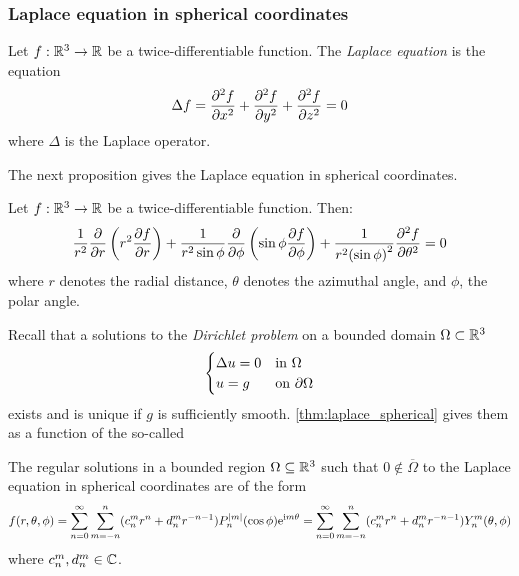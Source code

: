 \documentclass[../main.tex]{subfiles}
\begin{document}
\subsubsection{Laplace equation in spherical coordinates}\label{sec:laplace_spherical}
\begin{definition}
  Let $f:\mathbb{R}^3\rightarrow\mathbb{R}$ be a twice-differentiable function. The \emph{Laplace equation} is the equation
  \begin{equation}
    \Delta f=\pdv[2]{f}{x}+\pdv[2]{f}{y}+\pdv[2]{f}{z}=0
  \end{equation}
  where $\Delta$ is the Laplace operator.
\end{definition}
The next proposition gives the Laplace equation in spherical coordinates.
\begin{proposition}
  Let $f:\mathbb{R}^3\rightarrow\mathbb{R}$ be a twice-differentiable function. Then:
  \begin{equation}\label{eq:laplace}
    \frac{1}{r^2}\pdv{}{r}\left(r^2\pdv{f}{r}\right)+\frac{1}{r^2\sin\phi}\pdv{}{\phi}\left(\sin\phi\pdv{f}{\phi}\right)+\frac{1}{r^2{(\sin\phi)}^2}\pdv[2]{f}{\theta}=0
  \end{equation}
  where $r$ denotes the radial distance, $\theta$ denotes the azimuthal angle, and $\phi$, the polar angle.
\end{proposition}
Recall that a solutions to the \emph{Dirichlet problem} on a bounded domain $\Omega\subset\mathbb{R}^3$
\begin{equation}
  \begin{cases}
    \Delta u=0 & \text{in } \Omega         \\
    u=g            & \text{on } \partial\Omega
  \end{cases}
\end{equation}
exists and is unique if $g$ is sufficiently smooth. \cref{thm:laplace_spherical} gives them as a function of the so-called
\begin{theorem}\label{thm:laplace_spherical}
  The regular solutions in a bounded region $\Omega\subseteq \mathbb{R}^3$ such that $0\notin\overline{\Omega}$ to the Laplace equation in spherical coordinates are of the form
  \begin{equation}\label{eq:sol_laplace}
    f(r,\theta,\phi) = \sum_{n=0}^\infty \sum_{m=-n}^n (c_{n}^m r^{n} +d_n^mr^{-n-1})P_n^\abs{m}(\cos\phi) \mathrm{e}^{\mathrm{i} m\theta}= \sum_{n=0}^\infty \sum_{m=-n}^n (c_{n}^m r^{n} +d_n^mr^{-n-1})Y_n^m(\theta,\phi)
  \end{equation}
  where $c_{n}^m,d_n^m\in\mathbb{C}$.
\end{theorem}
\end{document}
